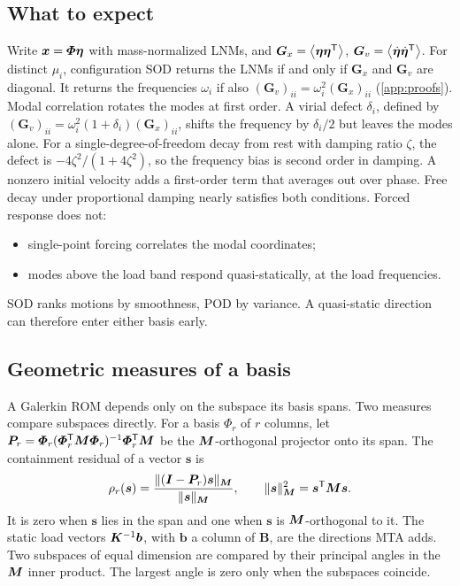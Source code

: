 \documentclass[preprint,12pt]{elsarticle}
\begin{document}
\subsection{What to expect}\label{sec:expect}
Write $\bm{x}=\bm{\varPhi}\bm{\eta}$ with mass-normalized LNMs, and $\bm{G}_x=\left\langle \bm{\eta}\bm{\eta}^{\mathsf T} \right\rangle$, $\bm{G}_v=\left\langle \dot{\bm{\eta}}\dot{\bm{\eta}}^{\mathsf T} \right\rangle$.
For distinct $\mu_i$, configuration SOD returns the LNMs if and only if $\bm{G}_x$ and $\bm{G}_v$ are diagonal. It returns the frequencies $\omega_i$ if also $(\bm{G}_v)_{ii}=\omega_i^2(\bm{G}_x)_{ii}$ (\ref{app:proofs}).
Modal correlation rotates the modes at first order. A virial defect $\delta_i$, defined by $(\bm{G}_v)_{ii}=\omega_i^2(1+\delta_i)(\bm{G}_x)_{ii}$, shifts the frequency by $\delta_i/2$ but leaves the modes alone.
For a single-degree-of-freedom decay from rest with damping ratio $\zeta$, the defect is $-4\zeta^2/(1+4\zeta^2)$, so the frequency bias is second order in damping. A nonzero initial velocity adds a first-order term that averages out over phase.
Free decay under proportional damping nearly satisfies both conditions. Forced response does not:
\begin{itemize}
\item single-point forcing correlates the modal coordinates;
\item modes above the load band respond quasi-statically, at the load frequencies.
\end{itemize}
SOD ranks motions by smoothness, POD by variance. A quasi-static direction can therefore enter either basis early.

\subsection{Geometric measures of a basis}\label{sec:geommeasure}
A Galerkin ROM depends only on the subspace its basis spans. Two measures compare subspaces directly.
For a basis $\bm{\varPhi}_r$ of $r$ columns, let $\bm{P}_r=\bm{\varPhi}_r(\bm{\varPhi}_r^{\mathsf T}\bm{M}\bm{\varPhi}_r)^{-1}\bm{\varPhi}_r^{\mathsf T}\bm{M}$ be the $\bm{M}$-orthogonal projector onto its span. The containment residual of a vector $\bm{s}$ is
\begin{equation}
\rho_r(\bm{s})=\frac{\|(\bm{I}-\bm{P}_r)\bm{s}\|_{\bm{M}}}{\|\bm{s}\|_{\bm{M}}},\qquad \|\bm{s}\|_{\bm{M}}^2=\bm{s}^{\mathsf T}\bm{M}\bm{s}.
\label{eq:contain}
\end{equation}
It is zero when $\bm{s}$ lies in the span and one when $\bm{s}$ is $\bm{M}$-orthogonal to it. The static load vectors $\bm{K}^{-1}\bm{b}$, with $\bm{b}$ a column of $\bm{B}$, are the directions MTA adds.
Two subspaces of equal dimension are compared by their principal angles in the $\bm{M}$ inner product. The largest angle is zero only when the subspaces coincide.
\end{document}
